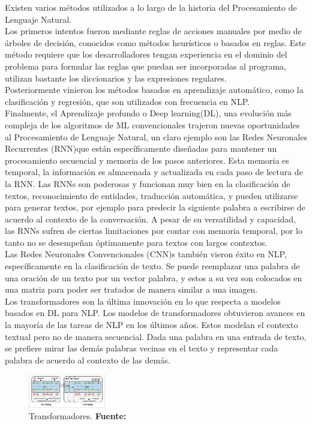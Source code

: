 Existen varios métodos utilizados a lo largo de la historia del Procesamiento de Lenguaje Natural.\\
Los primeros intentos fueron mediante reglas de acciones manuales por medio de árboles de decisión, conocidos como métodos heurísticos o basados en reglas. Este método requiere que los desarrolladores tengan experiencia en el dominio del problema para formular las reglas que puedan ser incorporadas al programa, utilizan bastante los diccionarios y las expresiones regulares.\\
\indent Posteriormente vinieron los métodos basados en aprendizaje automático, como la clasificación y regresión, que son utilizados con frecuencia en NLP.\\
\indent Finalmente, el Aprendizaje profundo o Deep learning(DL), una evolución más compleja de los algoritmos de ML convencionales trajeron nuevas oportunidades al Procesamiento de Lenguaje Natural, un claro ejemplo son las Redes Neuronales Recurrentes (RNN)que están específicamente diseñadas para mantener un procesamiento secuencial y memoria de los pasos anteriores. Esta memoria es temporal, la información es almacenada y actualizada en cada paso de lectura de la RNN. Las RNNs son poderosas y funcionan muy bien en la clasificación de textos, reconocimiento de entidades, traducción automática, y pueden utilizarse para generar textos, por ejemplo para predecir la siguiente palabra a escribirse de acuerdo al contexto de la conversación. A pesar de su versatilidad y capacidad, las RNNs sufren de ciertas limitaciones por contar con memoria temporal, por lo tanto no se desempeñan óptimamente
para textos con largos contextos.\\
\indent Las Redes Neuronales Convencionales (CNN)s también vieron éxito en NLP, específicamente en la clasificación de texto. Se puede reemplazar una palabra de una oración de un texto por un vector palabra, y estos a su vez son colocados en una matriz para poder ser tratados de manera similar a una imagen.\\
\indent Los transformadores son la última innovación en lo que respecta a modelos basados en DL para NLP. Los modelos de transformadores obtuvieron avances en la mayoría de las tareas de NLP en los últimos años. Estos modelan el contexto textual pero no de manera secuencial. Dada una palabra en una entrada de texto, se prefiere mirar las demás palabras vecinas en el texto y representar cada palabra de acuerdo al contexto de las demás.
\begin{figure}[H]
\begin{centering}
\includegraphics[angle=0,width=0.3\textwidth]{Figuras/tranformers.png}
\par \end{centering}
\caption[Transformadores]{Transformadores. \textbf{Fuente:} \cite{sowmya_practical_npl}}
\label{NLP}
\end{figure}


